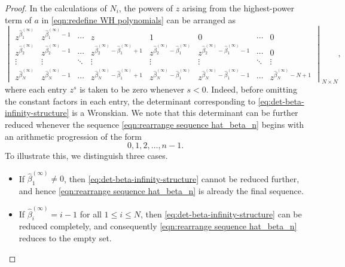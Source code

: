 \documentclass[preprint,3p,10pt]{elsarticle}
\theoremstyle{definition}
\begin{document}
\begin{proof}
In the calculations of \(N_i\), the powers of \(z\) arising from the highest-power term of \(a\) in \eqref{eqn:redefine WH polynomials} can be arranged as  \cite{lin2024rogue}
\begin{equation}\label{eq:det-beta-infinity-structure}
\begin{vmatrix}
z^{\widehat{\beta}^{(\infty)}_1} & z^{\widehat{\beta}^{(\infty)}_1-1} & \cdots & z & 1 & 0 & \cdots & 0 \\
z^{\widehat{\beta}^{(\infty)}_2} & z^{\widehat{\beta}^{(\infty)}_2-1} & \cdots & z^{\widehat{\beta}^{(\infty)}_2-\widehat{\beta}^{(\infty)}_1+1} & z^{\widehat{\beta}^{(\infty)}_2-\widehat{\beta}^{(\infty)}_1} & z^{\widehat{\beta}^{(\infty)}_2-\widehat{\beta}^{(\infty)}_1-1} & \cdots & 0 \\
\vdots & \vdots & \ddots & \vdots & \vdots & \vdots & \ddots & \vdots \\
z^{\widehat{\beta}^{(\infty)}_{N}} & z^{\widehat{\beta}^{(\infty)}_{N}-1} & \cdots & z^{\widehat{\beta}^{(\infty)}_{N}-\widehat{\beta}^{(\infty)}_1+1} & z^{\widehat{\beta}^{(\infty)}_{N}-\widehat{\beta}^{(\infty)}_1} & z^{\widehat{\beta}^{(\infty)}_{N}-\widehat{\beta}^{(\infty)}_1-1} & \cdots & z^{\widehat{\beta}^{(\infty)}_{N}-N+1}
\end{vmatrix}_{N\times N},
\end{equation}
where each entry \(z^s\) is taken to be zero whenever \(s<0\). Indeed, before omitting the constant factors in each entry, the determinant corresponding to \eqref{eq:det-beta-infinity-structure} is a Wronskian. We note that this determinant can be further reduced whenever the sequence \eqref{eqn:rearrange sequence hat_beta_n} begins with an arithmetic progression of the form
\begin{equation}
0,1,2,\ldots,n-1.
\end{equation}
To illustrate this, we distinguish three cases.
\begin{itemize}
    \item If \(\widehat{\beta}^{(\infty)}_1 \neq 0\), then \eqref{eq:det-beta-infinity-structure} cannot be reduced further, and hence \eqref{eqn:rearrange sequence hat_beta_n} is already the final sequence.
    
    \item If \(\widehat{\beta}^{(\infty)}_i=i-1\) for all \(1\le i\le N\), then \eqref{eq:det-beta-infinity-structure} can be reduced completely, and consequently \eqref{eqn:rearrange sequence hat_beta_n} reduces to the empty set.
    

\end{itemize}
\end{proof}
\end{document}
